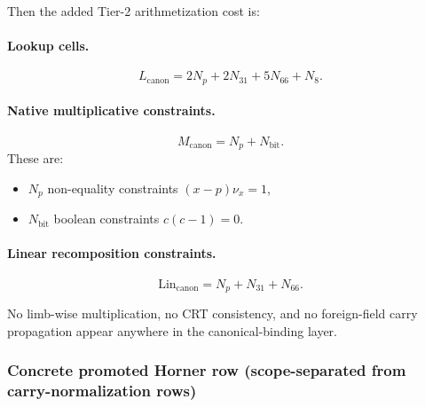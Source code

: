 ﻿\documentclass[11pt]{article}
\begin{document}
Then the added Tier-2 arithmetization cost is:

\paragraph{Lookup cells.}
\begin{equation}
L_{\mathrm{canon}}
=
2N_p + 2N_{31} + 5N_{66} + N_8.
\label{eq:canon-lookup-cost}
\end{equation}

\paragraph{Native multiplicative constraints.}
\begin{equation}
M_{\mathrm{canon}}
=
N_p + N_{\mathrm{bit}}.
\label{eq:canon-mul-cost}
\end{equation}
These are:
\begin{itemize}[leftmargin=2em]
    \item \(N_p\) non-equality constraints \((x-p)\nu_x=1\),
    \item \(N_{\mathrm{bit}}\) boolean constraints \(c(c-1)=0\).
\end{itemize}

\paragraph{Linear recomposition constraints.}
\begin{equation}
\mathrm{Lin}_{\mathrm{canon}}
=
N_p + N_{31} + N_{66}.
\label{eq:canon-lin-cost}
\end{equation}

No limb-wise multiplication, no CRT consistency, and no foreign-field carry propagation appear anywhere in the canonical-binding layer.

\subsubsection{Concrete promoted Horner row (scope-separated from carry-normalization rows)}
\end{document}
